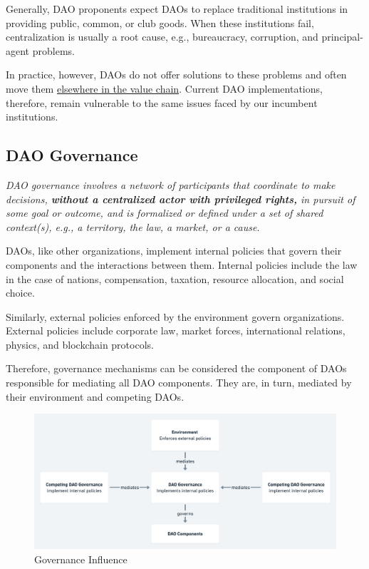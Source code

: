 \documentclass[
]{article}
\begin{document}
Generally, DAO proponents expect DAOs to replace traditional
institutions in providing public, common, or club goods. When these
institutions fail, centralization is usually a root cause, e.g.,
bureaucracy, corruption, and principal-agent problems.

In practice, however, DAOs do not offer solutions to these problems and
often move them
\href{https://kelsienabben.substack.com/p/towards-a-model-of-resilience-in}{elsewhere
in the value chain}. Current DAO implementations, therefore, remain
vulnerable to the same issues faced by our incumbent institutions.

\hypertarget{dao-governance}{%
\subsection{DAO Governance}\label{dao-governance}}

\emph{DAO governance involves a network of participants that coordinate
to make decisions, \textbf{without a centralized actor with privileged
rights,} in pursuit of some goal or outcome, and is formalized or
defined under a set of shared context(s), e.g., a territory, the law, a
market, or a cause.}

DAOs, like other organizations, implement internal policies that govern
their components and the interactions between them. Internal policies
include the law in the case of nations, compensation, taxation, resource
allocation, and social choice.

Similarly, external policies enforced by the environment govern
organizations. External policies include corporate law, market forces,
international relations, physics, and blockchain protocols.

Therefore, governance mechanisms can be considered the component of DAOs
responsible for mediating all DAO components. They are, in turn,
mediated by their environment and competing DAOs.

\begin{figure}
\centering
\includegraphics[width=\textwidth]{./img/governance_influence.png}
\caption{Governance Influence}
\end{figure}
\end{document}
